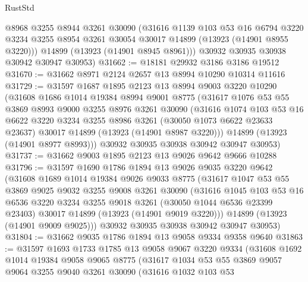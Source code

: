 \begin{lexlean}{RustStd}
\begin{coremodule}
        @8968
        @3255
        @8944
        @3261
        @30090
        (@31616
          @1139
          @103
          @53
          @16
          @6794
          @3220
          @3234
          @3255
          @8954
          @3261
          @30054
          @30017
          @14899
          (@13923 (@14901 @8955 @3220)))
        @14899
        (@13923 (@14901 @8945 @8961)))
      @30932
      @30935
      @30938
      @30942
      @30947
      @30953)
@31662 := @18181 @29932 @3186 @3186 @19512
@31670 := @31662 @8971 @2124 @2657 @13 @8994 @10290 @10314 @11616
@31729 := @31597
    @1687
    @1895
    @2123
    @13
    @8994
    @9003
    @3220
    @10290
    (@31608
      @1686
      @1014
      @19384
      @8994
      @9001
      @8775
      (@31617
        @1076
        @53
        @55
        @3869
        @8993
        @9000
        @3255
        @8976
        @3261
        @30090
        (@31616
          @1074
          @103
          @53
          @16
          @6622
          @3220
          @3234
          @3255
          @8986
          @3261
          (@30050 @1073 @6622 @23633 @23637)
          @30017
          @14899
          (@13923 (@14901 @8987 @3220)))
        @14899
        (@13923 (@14901 @8977 @8993)))
      @30932
      @30935
      @30938
      @30942
      @30947
      @30953)
@31737 := @31662 @9003 @1895 @2123 @13 @9026 @9642 @9666 @10288
@31796 := @31597
    @1690
    @1786
    @1894
    @13
    @9026
    @9035
    @3220
    @9642
    (@31608
      @1689
      @1014
      @19384
      @9026
      @9033
      @8775
      (@31617
        @1047
        @53
        @55
        @3869
        @9025
        @9032
        @3255
        @9008
        @3261
        @30090
        (@31616
          @1045
          @103
          @53
          @16
          @6536
          @3220
          @3234
          @3255
          @9018
          @3261
          (@30050 @1044 @6536 @23399 @23403)
          @30017
          @14899
          (@13923 (@14901 @9019 @3220)))
        @14899
        (@13923 (@14901 @9009 @9025)))
      @30932
      @30935
      @30938
      @30942
      @30947
      @30953)
@31804 := @31662 @9035 @1786 @1894 @13 @9058 @9334 @9358 @9640
@31863 := @31597
    @1693
    @1733
    @1785
    @13
    @9058
    @9067
    @3220
    @9334
    (@31608
      @1692
      @1014
      @19384
      @9058
      @9065
      @8775
      (@31617
        @1034
        @53
        @55
        @3869
        @9057
        @9064
        @3255
        @9040
        @3261
        @30090
        (@31616
          @1032
          @103
          @53

\end{coremodule}
\end{lexlean}
